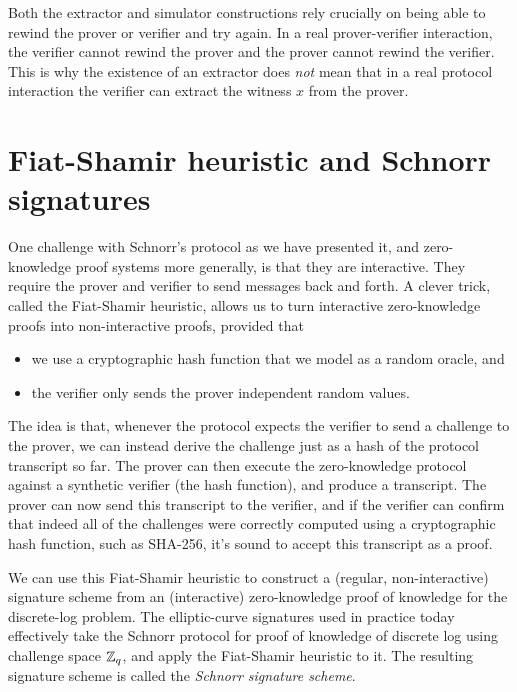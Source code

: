 Both the extractor and simulator constructions rely crucially on being
able to rewind the prover or verifier and try again. 
In a real prover-verifier interaction, the verifier cannot rewind the prover
and the prover cannot rewind the verifier.
This is why the existence of an extractor does \emph{not} mean that
in a real protocol interaction the verifier can extract the witness
$x$ from the prover.


\section{Fiat-Shamir heuristic and Schnorr signatures}
\label{sec:hvzk}

One challenge with Schnorr's protocol as we have presented it,
and zero-knowledge proof systems more generally,
is that they are interactive.
They require the prover and verifier to send messages back and forth.
A clever trick, called the Fiat-Shamir heuristic, allows us to turn interactive
zero-knowledge proofs into non-interactive proofs, provided that
\begin{itemize}
  \item we use a cryptographic hash function that we model as a random oracle, and
  \item the verifier only sends the prover independent random values.
\end{itemize}
The idea is that, whenever the protocol expects the verifier to send a challenge to the
prover, we can instead derive the challenge just as a hash of the protocol transcript so far.
The prover can then execute the zero-knowledge
protocol against a synthetic verifier (the hash function), and produce
a transcript.  The prover can now send this transcript to the verifier,
and if the verifier can confirm that indeed all of the challenges were
correctly computed using a cryptographic hash function, such as 
SHA-256, it's sound to accept this transcript as a proof.

We can use this Fiat-Shamir heuristic to construct a (regular,
non-interactive) signature scheme from an (interactive) zero-knowledge
proof of knowledge for the discrete-log problem.
The elliptic-curve signatures used in practice today
effectively take the Schnorr protocol for proof of knowledge of discrete log
using challenge space $\mathbb{Z}_q$, and apply the Fiat-Shamir heuristic to it.
The resulting signature scheme is called the \emph{Schnorr signature scheme}.
